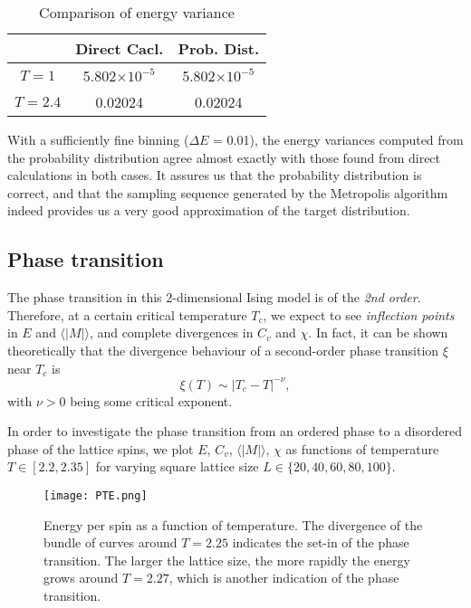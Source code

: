 \documentclass{article}
\begin{document}
\begin{table}[ht]
\caption{Comparison of energy variance}
\centering
\begin{tabular}{c c c}
\hline\hline
 & Direct Cacl. & Prob. Dist. \\
 \hline
 $T=1$ & 5.802$\times10^{-5}$ & 5.802$\times10^{-5}$\\
 $T=2.4$ & 0.02024 & 0.02024 \\
 \hline
\end{tabular}
\end{table}

With a sufficiently fine binning ($\Delta E$ = 0.01), the energy variances computed from the probability distribution agree almost exactly with those found from direct calculations in both cases. It assures us that the probability distribution is correct, and that the sampling sequence generated by the Metropolis algorithm indeed provides us a very good approximation of the target distribution. 

\subsection{Phase transition}

The phase transition in this 2-dimensional Ising model is of the \emph{2nd order}. Therefore, at a certain critical temperature $T_c$, we expect to see \emph{inflection points} in $E$ and $\langle|M|\rangle$, and complete divergences in $C_v$ and $\chi$. In fact, it can be shown theoretically that the divergence behaviour of a second-order phase transition $\xi$ near $T_c$ is
\begin{equation}
\xi(T) \sim |T_c - T|^{-\nu},
\end{equation}
with $\nu > 0$ being some critical exponent. \cite{textbook} \cite{notes}

In order to investigate the phase transition from an ordered phase to a disordered phase of the lattice spins, we plot $E$, $C_v$, $\langle|M|\rangle$, $\chi$ as functions of temperature $T \in [2.2, 2.35]$ for varying square lattice size $L \in \{20, 40, 60, 80, 100\}$. 

\begin{figure}[h]
\begin{center}
\texttt{[image: PTE.png]}
\caption{Energy per spin as a function of temperature. The divergence of the bundle of curves around $T=2.25$ indicates the set-in of the phase transition. The larger the lattice size, the more rapidly the energy grows around $T=2.27$, which is another indication of the phase transition.}
\end{center}
\end{figure}
\end{document}
